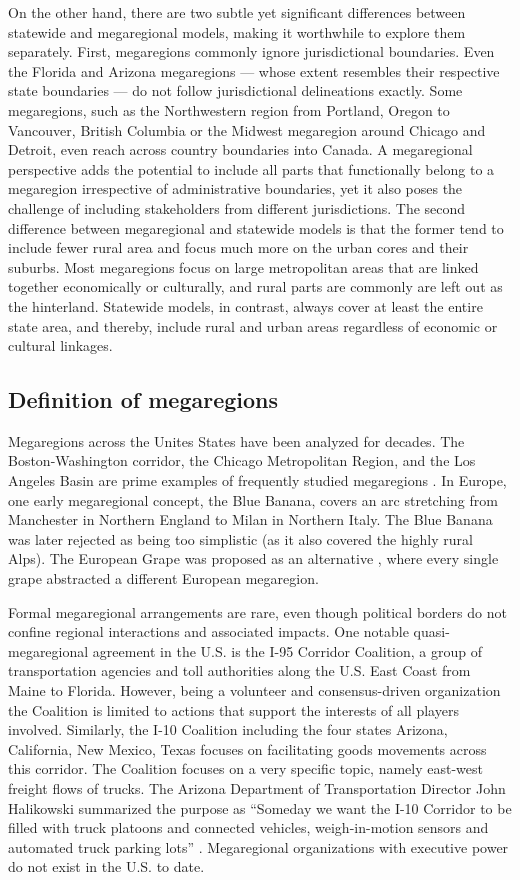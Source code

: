 On the other hand, there are two subtle yet significant differences between statewide and megaregional models, making it worthwhile to explore them separately. First, megaregions commonly ignore jurisdictional boundaries. Even the Florida and Arizona megaregions --- whose extent resembles their respective state boundaries --- do not follow jurisdictional delineations exactly. Some megaregions, such as the Northwestern region from Portland, Oregon to Vancouver, British Columbia or the Midwest megaregion around Chicago and Detroit, even reach across country boundaries into Canada. A megaregional perspective adds the potential to include all parts that functionally belong to a megaregion irrespective of administrative boundaries, yet it also poses the challenge of including stakeholders from different jurisdictions. The second difference between megaregional and statewide models is that the former tend to include fewer rural area and focus much more on the urban cores and their suburbs. Most megaregions focus on large metropolitan areas that are linked together economically or culturally, and rural parts are commonly are left out as the hinterland. Statewide models, in contrast, always cover at least the entire state area, and thereby, include rural and urban areas regardless of economic or cultural linkages.

\subsection{Definition of megaregions}

Megaregions across the Unites States have been analyzed for decades. The Boston-Washington corridor, the Chicago Metropolitan Region, and the Los Angeles Basin are prime examples of frequently studied megaregions \citep{florida08}. In Europe, one early megaregional concept, the Blue Banana, covers an arc stretching from Manchester in Northern England to Milan in Northern Italy. The Blue Banana was later rejected as being too simplistic (as it also covered the highly rural Alps). The European Grape was proposed as an alternative \citep{kunzmann01}, where every single grape abstracted a different European megaregion.

Formal megaregional arrangements are rare, even though political borders do not confine regional interactions and associated impacts. One notable quasi-megaregional agreement in the U.S. is the I-95 Corridor Coalition, a group of transportation agencies and toll authorities along the U.S. East Coast from Maine to Florida. However, being a volunteer and consensus-driven organization the Coalition is limited to actions that support the interests of all players involved. Similarly, the I-10 Coalition including the four states Arizona, California, New Mexico, Texas focuses on facilitating goods movements across this corridor. The Coalition focuses on a very specific topic, namely east-west freight flows of trucks. The Arizona Department of Transportation Director John Halikowski summarized the purpose as ``Someday we want the I-10 Corridor to be filled with truck platoons and connected vehicles, weigh-in-motion sensors and automated truck parking lots'' \citep{adot16}. Megaregional organizations with executive power do not exist in the U.S. to date.

